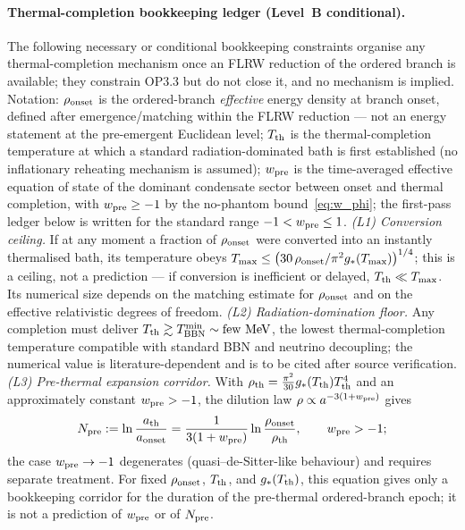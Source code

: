 \paragraph{Thermal-completion bookkeeping ledger (Level~B
conditional).}
The following necessary or conditional bookkeeping constraints
organise any thermal-completion mechanism once an FLRW reduction of
the ordered branch is available; they constrain OP3.3 but do not close it, and
no mechanism is implied.
Notation: $\rho_{\rm onset}$ is the ordered-branch \emph{effective}
energy density at branch onset, defined after emergence/matching
within the FLRW reduction --- not an energy statement at the
pre-emergent Euclidean level; $T_{\rm th}$ is the
thermal-completion temperature at which a standard
radiation-dominated bath is first established (no inflationary
reheating mechanism is assumed); $w_{\rm pre}$ is the
time-averaged effective equation of state of the dominant
condensate sector between onset and thermal completion, with
$w_{\rm pre}\ge-1$ by the no-phantom
bound~\eqref{eq:w_phi}; the first-pass ledger below is written for
the standard range $-1<w_{\rm pre}\le1$.
\emph{(L1) Conversion ceiling.}
If at any moment a fraction of $\rho_{\rm onset}$ were converted
into an instantly thermalised bath, its temperature obeys
$T_{\max}\le\bigl(30\,\rho_{\rm onset}/\pi^2
g_*(T_{\max})\bigr)^{1/4}$; this is a ceiling, not a prediction
--- if conversion is inefficient or delayed,
$T_{\rm th}\ll T_{\max}$.
Its numerical size depends on the matching estimate for
$\rho_{\rm onset}$ and on the effective relativistic degrees of
freedom.
\emph{(L2) Radiation-domination floor.}
Any completion must deliver
$T_{\rm th}\gtrsim T^{\min}_{\rm BBN}\sim\text{few~MeV}$, the
lowest thermal-completion temperature compatible with standard BBN
and neutrino decoupling; the numerical value is
literature-dependent and is to be cited after source verification.
\emph{(L3) Pre-thermal expansion corridor.}
With $\rho_{\rm th}=\tfrac{\pi^2}{30}g_*(T_{\rm th})T_{\rm th}^4$
and an approximately constant $w_{\rm pre}>-1$, the dilution law
$\rho\propto a^{-3(1+w_{\rm pre})}$ gives
\[
N_{\rm pre}
:=\ln\frac{a_{\rm th}}{a_{\rm onset}}
=\frac{1}{3(1+w_{\rm pre})}
 \ln\frac{\rho_{\rm onset}}{\rho_{\rm th}} ,
\qquad w_{\rm pre}>-1 ;
\]
the case $w_{\rm pre}\to-1$ degenerates (quasi--de-Sitter-like
behaviour) and requires separate treatment.
For fixed $\rho_{\rm onset}$, $T_{\rm th}$, and $g_*(T_{\rm th})$,
this equation gives only a bookkeeping corridor for the duration
of the pre-thermal ordered-branch epoch; it is not a prediction of
$w_{\rm pre}$ or of $N_{\rm pre}$.
